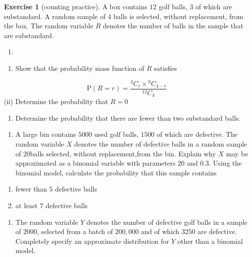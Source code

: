 \documentclass[
]{book}
\providecommand{\tightlist}{%
  \setlength{\itemsep}{0pt}\setlength{\parskip}{0pt}}
\theoremstyle{definition}
\theoremstyle{definition}
\theoremstyle{definition}
\newtheorem{exercise}{Exercise}[chapter]
\theoremstyle{definition}
\theoremstyle{remark}
\begin{document}
\begin{exercise}[counting practice]

A box contains \(12\) golf balls, \(3\) of which are substandard. A random sample of \(4\) balls is selected, without replacement, from the box. The random variable \(R\) denotes the number of balls in the sample that are substandard.

\begin{enumerate}
\def\labelenumi{\alph{enumi})}
\item
\end{enumerate}

\begin{enumerate}
\def\labelenumi{(\roman{enumi})}
\tightlist
\item
  Show that the probability mass function of \(R\) satisfies
\end{enumerate}

\[\text{P}(R=r) = \frac{{}^3C_r \times {}^9C_{4-r}}{^{12}C_{4}} \]
(ii) Determine the probability that \(R=0\)

\begin{enumerate}
\def\labelenumi{(\roman{enumi})}
\setcounter{enumi}{2}
\tightlist
\item
  Determine the probability that there are fewer than two substandard balls.
\end{enumerate}

\begin{enumerate}
\def\labelenumi{\alph{enumi})}
\setcounter{enumi}{1}
\tightlist
\item
  A large bin contains \(5000\) used golf balls, \(1500\) of which are defective. The random variable \(X\) denotes the number of defective balls in a random sample of 20balls selected, without replacement,from the bin. Explain why \(X\) may be approximated as a binomial variable with parameters \(20\) and \(0.3\). Using the binomial model, calculate the probability that this sample contains
\end{enumerate}

\begin{enumerate}
\def\labelenumi{(\roman{enumi})}
\item
  fewer than \(5\) defective balls
\item
  at least \(7\) defective balls
\end{enumerate}

\begin{enumerate}
\def\labelenumi{\alph{enumi})}
\setcounter{enumi}{2}
\tightlist
\item
  The random variable \(Y\) denotes the number of defective golf balls in a sample of \(2000\), selected from a batch of \(200,000\) and of which \(3250\) are defective. Completely specify an approximate distribution for \(Y\) other than a binomial model.
\end{enumerate}

\end{exercise}
\end{document}
